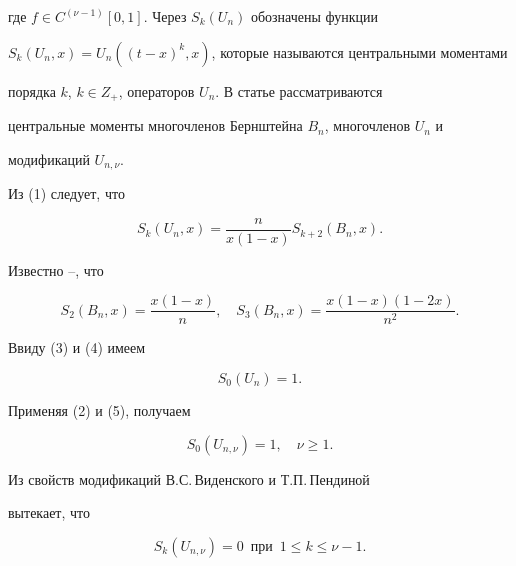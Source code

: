 где $f\in C^{(\nu-1)}[0,1]$. Через $S_k(U_n)$ обозначены функции 


$S_k(U_n,x)=U_n((t-x)^k,x)$, которые называются центральными моментами 


порядка $k$, $k\in Z_+$, операторов $U_n$. В статье рассматриваются 


центральные моменты многочленов Бернштейна $B_n$, многочленов $U_n$ и 


модификаций $U_{n,\nu}$. 


 


Из (1) следует, что 


\begin{equation} 


S_k(U_n,x)=\frac{n}{x(1-x)}S_{k+2}(B_n,x). 


\end{equation} 


Известно \cite{1}--\cite{3}, что 


\begin{equation} 


S_2(B_n,x)=\frac{x(1-x)}{n},\quad 


S_3(B_n,x)=\frac{x(1-x)(1-2x)}{n^2}.


\end{equation} 


Ввиду (3) и (4) имеем 


\begin{equation} 


S_0(U_n)=1. 


\end{equation} 


Применяя (2) и (5), получаем 


\begin{equation} 


S_0(U_{n,\nu})=1,\quad \nu\ge1. 


\end{equation} 


Из свойств модификаций В.С.\,Виденского и Т.П.\,Пендиной \cite{4} 


вытекает, что 


\begin{equation} 


S_k(U_{n,\nu})=0\ \; 


\text{при} \ \; 1\le k\le\nu-1. 


\end{equation} 


 


